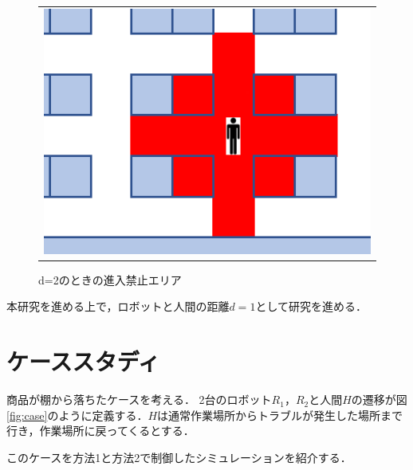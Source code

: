 \begin{figure}[htbp]
\begin{center}
\begin{tabular}{c}
      \begin{minipage}{0.5\hsize}
        \begin{center}
          \includegraphics[scale=0.3]{figures/Method2_d2.pdf}
          \caption{d=2のときの進入禁止エリア}
          \label{fig:Method2_d2}
        \end{center}
      \end{minipage}
      
    \end{tabular}
  \end{center}
\end{figure}

本研究を進める上で，ロボットと人間の距離$d=1$として研究を進める．

\section{{ケーススタディ}}
商品が棚から落ちたケースを考える．
2台のロボット$R_1$，$R_2$と人間$H$の遷移が図\ref{fig:case}のように定義する．$H$は通常作業場所からトラブルが発生した場所まで行き，作業場所に戻ってくるとする．

このケースを方法1と方法2で制御したシミュレーションを紹介する．

\ 

